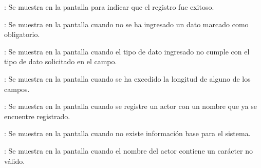 \begin{Citemize}
	\item {}: Se muestra en la pantalla  para indicar que el registro fue exitoso.
	\item {}: Se muestra en la pantalla  cuando no se ha ingresado un dato marcado como obligatorio.
	\item {}: Se muestra en la pantalla  cuando el tipo de dato ingresado no cumple con el tipo de dato solicitado en el campo.
	\item {}: Se muestra en la pantalla  cuando se ha excedido la longitud de alguno de los campos.
	\item {}: Se muestra en la pantalla  cuando se registre un actor con un nombre que ya se encuentre registrado.
	\item {}: Se muestra en la pantalla  cuando no existe información base para el sistema.
	\item {}: Se muestra en la pantalla  cuando el nombre del actor contiene un carácter no válido.
\end{Citemize}
